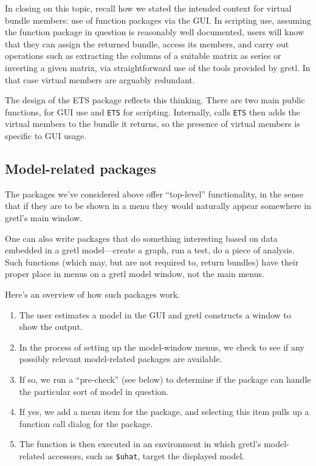 \documentclass[oneside]{book}
\begin{document}
In closing on this topic, recall how we stated the intended context for
virtual bundle members: use of function packages via the GUI. In
scripting use, assuming the function package in question is reasonably
well documented, users will know that they can assign the returned
bundle, access its members, and carry out operations such as extracting
the columns of a suitable matrix as series or inverting a given matrix,
via straightforward use of the tools provided by gretl. In that case
virtual members are arguably redundant.

The design of the \textsf{ETS} package reflects this thinking. There
are two main public functions,  for GUI use and
\texttt{ETS} for scripting. Internally,  calls
\texttt{ETS} then adds the virtual members to the bundle it returns,
so the presence of virtual members is specific to GUI usage.

\subsection{Model-related packages}

The packages we've considered above offer ``top-level'' functionality,
in the sense that if they are to be shown in a menu they would
naturally appear somewhere in gretl's main window.

One can also write packages that do something interesting based on
data embedded in a gretl model---create a graph, run a test, do a
piece of analysis. Such functions (which may, but are not required to,
return bundles) have their proper place in menus on a gretl model
window, not the main menus.

Here's an overview of how such packages work.

\begin{enumerate}
\item The user estimates a model in the GUI and gretl constructs a
  window to show the output.
\item In the process of setting up the model-window menus, we check to
  see if any possibly relevant model-related packages are available.
\item If so, we run a ``pre-check'' (see below) to determine
  if the package can handle the particular sort of model in
  question.
\item If yes, we add a menu item for the package, and selecting this
  item pulls up a function call dialog for the package.
\item The function is then executed in an environment in which gretl's
  model-related accessors, such as \verb|$uhat|, target the displayed
  model.%
\end{enumerate}
\end{document}
